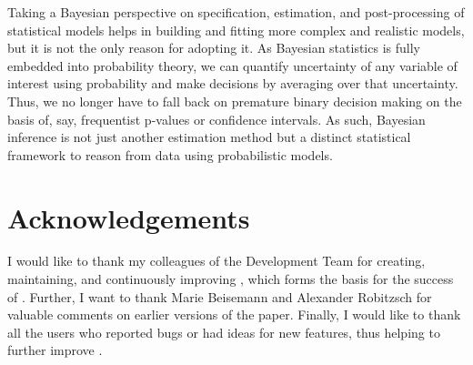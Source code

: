 \documentclass[jss]{jss}
\begin{document}
Taking a Bayesian perspective on specification, estimation, and
post-processing of statistical models helps in building and fitting more
complex and realistic models, but it is not the only reason for adopting
it. As Bayesian statistics is fully embedded into probability theory, we
can quantify uncertainty of any variable of interest using probability
and make decisions by averaging over that uncertainty. Thus, we no
longer have to fall back on premature binary decision making on the
basis of, say, frequentist p-values or confidence intervals. As such,
Bayesian inference is not just another estimation method but a distinct
statistical framework to reason from data using probabilistic models.

\hypertarget{acknowledgements}{%
\section{Acknowledgements}\label{acknowledgements}}

I would like to thank my colleagues of the  Development
Team for creating, maintaining, and continuously improving
, which forms the basis for the success of .
Further, I want to thank Marie Beisemann and Alexander Robitzsch for
valuable comments on earlier versions of the paper. Finally, I would
like to thank all the users who reported bugs or had ideas for new
features, thus helping to further improve .

\renewcommand\refname{References}

\end{document}
